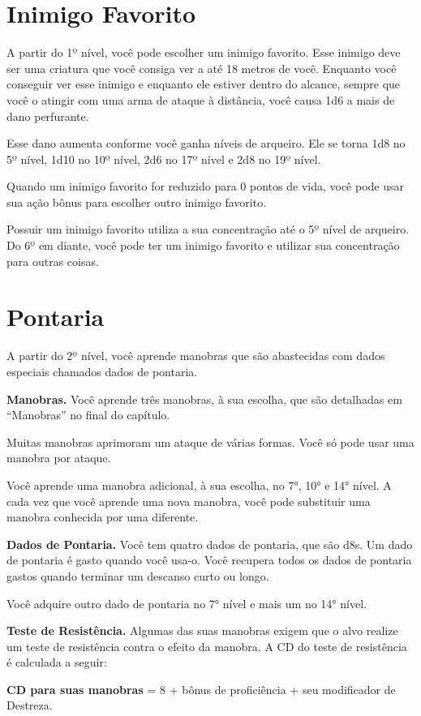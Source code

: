\documentclass{RPG_Adventure}[2021/10/20]
\begin{document}
\begin{multicols}{2}
\section*{Inimigo Favorito}%

A partir do 1º nível, você pode escolher um inimigo favorito. Esse inimigo deve
ser uma criatura que você consiga ver a até 18 metros de você. Enquanto você
conseguir ver esse inimigo e enquanto ele estiver dentro do alcance, sempre que
você o atingir com uma arma de ataque à distância, você causa 1d6 a mais de
dano perfurante.

Esse dano aumenta conforme você ganha níveis de arqueiro. Ele se torna 1d8 no
5º nível, 1d10 no 10º nível, 2d6 no 17º nível e 2d8 no 19º nível.

Quando um inimigo favorito for reduzido para 0 pontos de vida, você pode usar
sua ação bônus para escolher outro inimigo favorito.

Possuir um inimigo favorito utiliza a sua concentração até o 5º nível de
arqueiro. Do 6º em diante, você pode ter um inimigo favorito e utilizar sua
concentração para outras coisas.

\section*{Pontaria}%

A partir do 2º nível, você aprende manobras que são abastecidas com dados
especiais chamados dados de pontaria.

\textbf{Manobras.} Você aprende três manobras, à sua escolha, que são detalhadas
em ``Manobras'' no final do capítulo.

Muitas manobras aprimoram um ataque de várias formas. Você só pode usar uma
manobra por ataque.

Você aprende uma manobra adicional, à sua escolha, no 7°, 10° e 14° nível. A
cada vez que você aprende uma nova manobra, você pode substituir uma manobra
conhecida por uma diferente.

\textbf{Dados de Pontaria.} Você tem quatro dados de pontaria, que são d8s. Um
dado de pontaria é gasto quando você usa-o. Você recupera todos os dados de
pontaria gastos quando terminar um descanso curto ou longo.

Você adquire outro dado de pontaria no 7° nível e mais um no 14° nível.

\textbf{Teste de Resistência.} Algumas das suas manobras exigem que o alvo
realize um teste de resistência contra o efeito da manobra. A CD do teste de
resistência é calculada a seguir:
\begin{center}
\textbf{CD para suas manobras} = 8 + bônus de proficiência + seu modificador de
Destreza.
\end{center}


\end{multicols}
\end{document}
